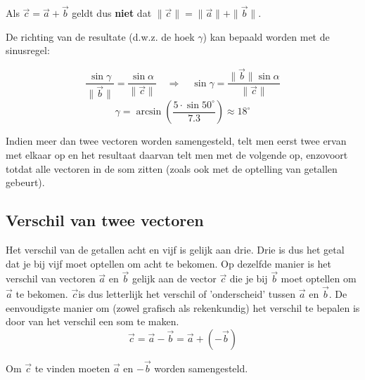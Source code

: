 \documentclass{ximera}
\begin{document}
\begin{remark}
Als \(\vec{c} = \vec{a} + \vec{b}\) geldt dus \textbf{niet} dat \(\|\vec{c}\| = \|\vec{a}\| + \|\vec{b}\|\).
\end{remark}


De richting van de resultate (d.w.z. de hoek \(\gamma\)) kan bepaald worden met de sinusregel: 

\[
\frac{\sin\gamma}{\|\vec{b}\|} = \frac{\sin\alpha}{\|\vec{c}\|}
\quad\Longrightarrow\quad
\sin\gamma = \frac{\|\vec{b}\|\sin\alpha}{\|\vec{c}\|}
\]
\[
\gamma = \arcsin\!\left(\frac{5\cdot\sin 50^\circ}{7.3}\right) \approx 18^\circ
\]



Indien meer dan twee vectoren worden samengesteld, telt men eerst twee ervan met elkaar op en het resultaat daarvan telt men met de volgende op, enzovoort totdat alle vectoren in de som zitten (zoals ook met de optelling van getallen gebeurt).


\subsection*{Verschil van twee vectoren}

Het verschil van de getallen acht en vijf is gelijk aan drie. 
Drie is dus het getal dat je bij vijf moet optellen om acht te bekomen. 
Op dezelfde manier is het verschil van vectoren \(\vec{a}\) en \(\vec{b}\) gelijk aan de vector \(\vec{c}\) die je bij \(\vec{b}\) moet optellen om \(\vec{a}\) te bekomen.
 \(\vec{c}\)is dus letterlijk het verschil of 'onderscheid' tussen \(\vec{a}\) en \(\vec{b}\). 
 De eenvoudigste manier om (zowel grafisch als rekenkundig) het verschil te bepalen is door van het verschil een som te maken. 
 \[
\vec{c} = \vec{a}-\vec{b} = \vec{a} + (-\vec{b})
 \]

 Om \(\vec{c}\) te vinden moeten \(\vec{a}\) en \(-\vec{b}\) worden samengesteld.

\begin{image}[0.5\textwidth]
    
\end{image}
\end{document}

